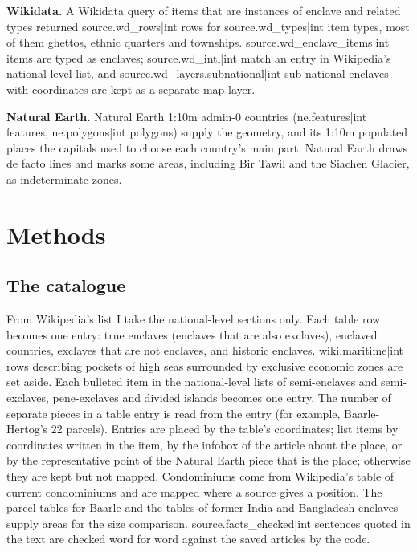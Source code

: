 \documentclass[11pt,a4paper]{article}
\begin{document}
\textbf{Wikidata.} A Wikidata query of items that are instances of enclave and related types returned {{source.wd_rows|int}} rows for {{source.wd_types|int}} item types, most of them ghettos, ethnic quarters and townships. {{source.wd_enclave_items|int}} items are typed as enclaves; {{source.wd_intl|int}} match an entry in Wikipedia's national-level list, and {{source.wd_layers.subnational|int}} sub-national enclaves with coordinates are kept as a separate map layer.

\textbf{Natural Earth.} Natural Earth 1:10m admin-0 countries ({{ne.features|int}} features, {{ne.polygons|int}} polygons) supply the geometry, and its 1:10m populated places the capitals used to choose each country's main part. Natural Earth draws de facto lines and marks some areas, including Bir Tawil and the Siachen Glacier, as indeterminate zones.

\section{Methods}
\subsection{The catalogue}
From Wikipedia's list I take the national-level sections only. Each table row becomes one entry: true enclaves (enclaves that are also exclaves), enclaved countries, exclaves that are not enclaves, and historic enclaves. {{wiki.maritime|int}} rows describing pockets of high seas surrounded by exclusive economic zones are set aside. Each bulleted item in the national-level lists of semi-enclaves and semi-exclaves, pene-exclaves and divided islands becomes one entry. The number of separate pieces in a table entry is read from the entry (for example, Baarle-Hertog's 22 parcels). Entries are placed by the table's coordinates; list items by coordinates written in the item, by the infobox of the article about the place, or by the representative point of the Natural Earth piece that is the place; otherwise they are kept but not mapped. Condominiums come from Wikipedia's table of current condominiums and are mapped where a source gives a position. The parcel tables for Baarle and the tables of former India and Bangladesh enclaves supply areas for the size comparison. {{source.facts_checked|int}} sentences quoted in the text are checked word for word against the saved articles by the code.
\end{document}
